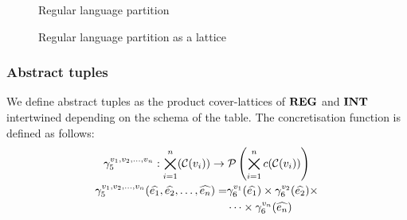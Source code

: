 \begin{figure}
    \center
    
    \caption{Regular language partition}
    \label{fig:tikz-reg-partition}
\end{figure}

\begin{figure}[!htb]
    \center
    
    \caption{Regular language partition as a lattice}
    \label{fig:tikz-reg-partition-lattice}
\end{figure}

\subsubsection{Abstract tuples}\label{subsubsec:abstract-tuples}

We define abstract tuples as the product cover-lattices of $\mathbf{REG}$ and $\mathbf{INT}$ intertwined depending on the schema of the table.
The concretisation function is defined as follows:
\begin{gather}
    \gamma^{v_1, v_2, \dots, v_n}_5 : \bigtimes_{i = 1}^{n}(\mathcal{C}(v_i)) \rightarrow \mathcal{P}\left(\bigtimes_{i = 1}^n c(\mathcal{C}(v_i)) \right)\\
    \begin{split}
        \gamma^{v_1, v_2, \dots, v_n}_5(\widehat{e_1}, \widehat{e_2}, \dots, \widehat{e_n}) = &\gamma^{v_1}_6(\widehat{e_1}) \times \gamma^{v_2}_6(\widehat{e_2}) \times\\
        &\dots \times \gamma^{v_n}_6(\widehat{e_n})
    \end{split}
\end{gather}

